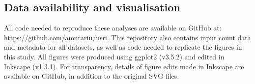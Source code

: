\documentclass{article}
\begin{document}




\subsection{Data availability and visualisation}
All code needed to reproduce these analyses are available on GitHub at: \url{https://github.com/amurariu/usri}. This repository also contains input count data and metadata for all datasets, as well as code needed to replicate the figures in this study. All figures were produced using ggplot2 (v3.5.2) \cite{wickham_ggplot_2016} and edited in Inkscape (v1.3.1). For transparency, details of figure edits made in Inkscape are available on GitHub, in addition to the original SVG files.
\end{document}
